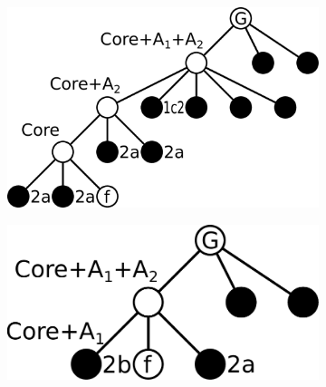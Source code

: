 \begin{figure}
    \begin{subfigure}{0.3\linewidth}\centering
        \includegraphics[height=\myMinHeight]{../../img/svg/seq_proof_figs_d}
        \caption{}\label{fig:seq_proof:d}
    \end{subfigure}%
    \hspace{2cm}
    \begin{subfigure}{0.3\linewidth}\centering
        \includegraphics[height=\myMinHeight]{../../img/svg/seq_proof_figs_e}
        \caption{}\label{fig:seq_proof:e}
    \end{subfigure}%


\end{figure}
